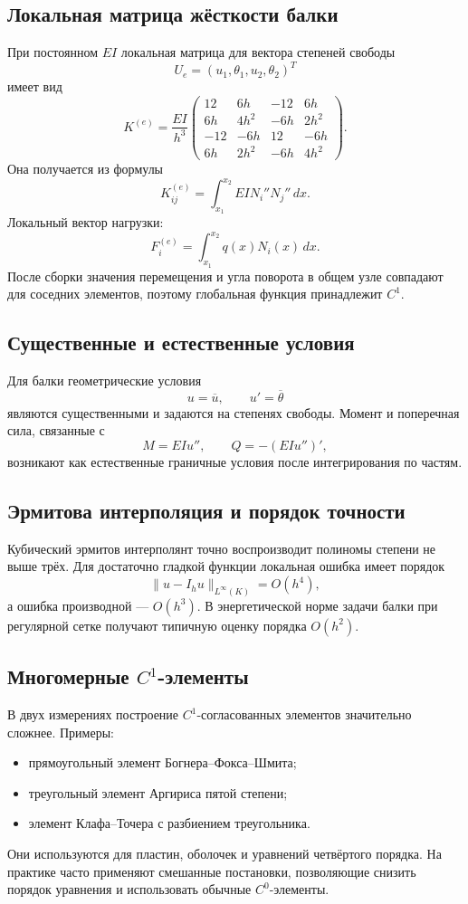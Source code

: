 \subsection{Локальная матрица жёсткости балки}

При постоянном $EI$ локальная матрица для вектора степеней свободы
\[
    U_e=(u_1,\theta_1,u_2,\theta_2)^T
\]
имеет вид
\[
K^{(e)}=\frac{EI}{h^3}
\begin{pmatrix}
12&6h&-12&6h\\
6h&4h^2&-6h&2h^2\\
-12&-6h&12&-6h\\
6h&2h^2&-6h&4h^2
\end{pmatrix}.
\]
Она получается из формулы
\[
    K_{ij}^{(e)}=\int_{x_1}^{x_2}EI N_i''N_j''\,dx.
\]
Локальный вектор нагрузки:
\[
    F_i^{(e)}=\int_{x_1}^{x_2}q(x)N_i(x)\,dx.
\]
После сборки значения перемещения и угла поворота в общем узле совпадают для
соседних элементов, поэтому глобальная функция принадлежит $C^1$.

\subsection{Существенные и естественные условия}

Для балки геометрические условия
\[
    u=\overline u,
    \qquad
    u'=\overline\theta
\]
являются существенными и задаются на степенях свободы. Момент и поперечная сила,
связанные с
\[
    M=EIu'',
    \qquad
    Q=-(EIu'')',
\]
возникают как естественные граничные условия после интегрирования по частям.

\subsection{Эрмитова интерполяция и порядок точности}

Кубический эрмитов интерполянт точно воспроизводит полиномы степени не выше
трёх. Для достаточно гладкой функции локальная ошибка имеет порядок
\[
    \|u-I_hu\|_{L^{\infty}(K)}=O(h^4),
\]
а ошибка производной --- $O(h^3)$. В энергетической норме задачи балки при
регулярной сетке получают типичную оценку порядка $O(h^2)$.

\subsection{Многомерные $C^1$-элементы}

В двух измерениях построение $C^1$-согласованных элементов значительно сложнее.
Примеры:
\begin{itemize}
    \item прямоугольный элемент Богнера--Фокса--Шмита;
    \item треугольный элемент Аргириса пятой степени;
    \item элемент Клафа--Точера с разбиением треугольника.
\end{itemize}
Они используются для пластин, оболочек и уравнений четвёртого порядка.
На практике часто применяют смешанные постановки, позволяющие снизить порядок
уравнения и использовать обычные $C^0$-элементы.

